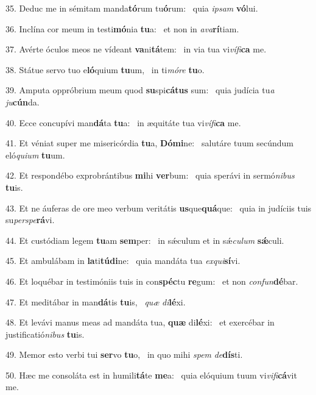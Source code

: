 35. Deduc me in sémitam manda\textbf{tó}rum tu\textbf{ó}rum: \ast\  quia \textit{ip}\textit{sam} \textbf{vó}lui.\

36. Inclína cor meum in testi\textbf{mó}nia \textbf{tu}a: \ast\  et non in \textit{a}\textit{va}\textbf{rí}tiam.\

37. Avérte óculos meos ne vídeant \textbf{va}ni\textbf{tá}tem: \ast\  in via tua vi\textit{ví}\textit{fi}\textbf{ca} me.\

38. Státue servo tuo e\textbf{ló}quium \textbf{tu}um, \ast\  in ti\textit{mó}\textit{re} \textbf{tu}o.\

39. Amputa oppróbrium meum quod \textbf{su}spi\textbf{cá}\textbf{tus} sum: \ast\  quia judícia tu\textit{a} \textit{ju}\textbf{cún}da.\

40. Ecce concupívi man\textbf{dá}ta \textbf{tu}a: \ast\  in æquitáte tua vi\textit{ví}\textit{fi}\textbf{ca} me.\

41. Et véniat super me misericórdia \textbf{tu}a, \textbf{Dó}\textbf{mi}ne: \ast\  salutáre tuum secúndum eló\textit{qui}\textit{um} \textbf{tu}um.\

42. Et respondébo exprobrántibus \textbf{mi}hi \textbf{ver}bum: \ast\  quia sperávi in sermó\textit{ni}\textit{bus} \textbf{tu}is.\

43. Et ne áuferas de ore meo verbum veritátis \textbf{us}que\textbf{quá}que: \ast\  quia in judíciis tuis su\textit{per}\textit{spe}\textbf{rá}vi.\

44. Et custódiam legem \textbf{tu}am \textbf{sem}per: \ast\  in sǽculum et in sǽ\textit{cu}\textit{lum} \textbf{sǽ}culi.\

45. Et ambulábam in \textbf{la}ti\textbf{tú}\textbf{di}ne: \ast\  quia mandáta tua \textit{ex}\textit{qui}\textbf{sí}vi.\

46. Et loquébar in testimóniis tuis in con\textbf{spéc}tu \textbf{re}gum: \ast\  et non \textit{con}\textit{fun}\textbf{dé}bar.\

47. Et meditábar in man\textbf{dá}tis \textbf{tu}is, \ast\  \textit{quæ} \textit{di}\textbf{lé}xi.\

48. Et levávi manus meas ad mandáta tua, \textbf{quæ} di\textbf{lé}xi: \ast\  et exercébar in justificatió\textit{ni}\textit{bus} \textbf{tu}is.\

49. Memor esto verbi tui \textbf{ser}vo \textbf{tu}o, \ast\  in quo mihi \textit{spem} \textit{de}\textbf{dís}ti.\

50. Hæc me consoláta est in humili\textbf{tá}te \textbf{me}a: \ast\  quia elóquium tuum vi\textit{vi}\textit{fi}\textbf{cá}vit me.\

